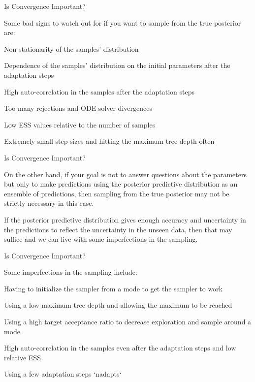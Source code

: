 \begin{frame}{Is Convergence Important?}
    \begin{vfilleditems}
        \item Some bad signs to watch out for if you want to sample from the true posterior are:
            \begin{vfilleditems}
                \item Non-stationarity of the samples' distribution
                \item Dependence of the samples' distribution on the initial parameters after the adaptation steps
                \item High auto-correlation in the samples after the adaptation steps
                \item Too many rejections and ODE solver divergences
                \item Low ESS values relative to the number of samples 
                \item Extremely small step sizes and hitting the maximum tree depth often
            \end{vfilleditems}
    \end{vfilleditems}
\end{frame}
\begin{frame}{Is Convergence Important?}
    \begin{vfilleditems}
        \item On the other hand, if your goal is not to answer questions about the parameters but only to make predictions using the posterior predictive distribution as an ensemble of predictions, then sampling from the true posterior may not be strictly necessary in this case.
        \item If the posterior predictive distribution gives enough accuracy and uncertainty in the predictions to reflect the uncertainty in the unseen data, then that may suffice and we can live with some imperfections in the sampling.
    \end{vfilleditems}
\end{frame}

\begin{frame}{Is Convergence Important?}
    \begin{vfilleditems}
        \item Some imperfections in the sampling include:
            \begin{vfilleditems}
                \item Having to initialize the sampler from a mode to get the sampler to work
                \item Using a low maximum tree depth and allowing the maximum to be reached
                \item Using a high target acceptance ratio to decrease exploration and sample around a mode
                \item High auto-correlation in the samples even after the adaptation steps and low relative ESS
                \item Using a few adaptation steps `nadapts`
            \end{vfilleditems}
    \end{vfilleditems}
\end{frame}

